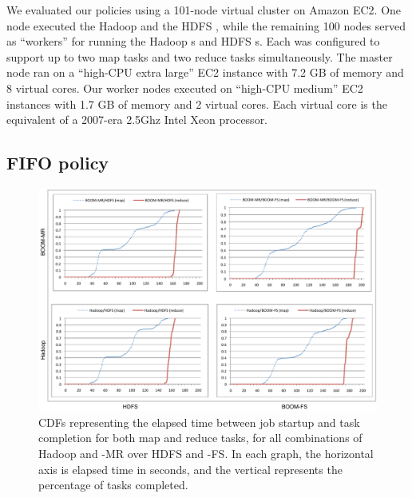 
We evaluated our \OVERLOG policies using a 101-node virtual cluster on Amazon
EC2.  One node executed the Hadoop \JT and the HDFS \NN, while the remaining
100 nodes served as ``workers'' for running the Hadoop {\TT}s and HDFS {\DN}s.  Each
{\TT} was configured to support up to two map tasks and two reduce
tasks simultaneously.  The master node ran on a ``high-CPU extra large'' EC2
instance with 7.2 GB of memory and 8 virtual cores.  Our worker nodes executed
on ``high-CPU medium'' EC2 instances with 1.7 GB of memory and 2 virtual cores.
Each virtual core is the equivalent of a 2007-era 2.5Ghz Intel Xeon processor.


\subsection{FIFO policy}

\begin{figure}
\ssp
\centering
	\includegraphics[scale=0.75]{figures/fourgraphs}
\caption{CDFs representing the elapsed time between job startup and task
  completion for both map and reduce tasks, for all combinations of Hadoop and \BOOM-MR
  over HDFS and \BOOM-FS\@.  In each graph, the horizontal axis is
  elapsed time in seconds, and the vertical represents the percentage of tasks completed.}
\label{fig:ec2experiment}
\end{figure}

